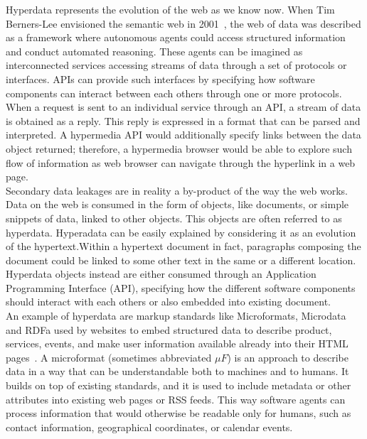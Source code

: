 Hyperdata represents the evolution of the web as we know now. When Tim Berners-­Lee envisioned the semantic web in 2001~\cite{SciAMMag}, the web of data was described as a framework where autonomous agents could access structured information and conduct automated reasoning. These agents can be imagined as interconnected services accessing streams of data through a set of protocols or interfaces. APIs can provide such interfaces by specifying how software components can interact between each others through one or more protocols. When a request is sent to an individual service through an API, a stream of data is obtained as a reply. This reply is expressed in a format that can be parsed and interpreted. A hypermedia API would additionally specify links between the data object returned; therefore, a hypermedia browser would be able to explore such flow of information as web browser can navigate through the hyperlink in a web page.\\

Secondary data leakages are in reality a by-product of the way the web works. Data on the web is consumed in the form of objects, like documents, or simple snippets of data, linked to other objects. This objects are often referred to as hyperdata. Hyperadata can be easily explained by considering it as an evolution of the hypertext.Within a hypertext document in fact, paragraphs composing the document could be linked to some other text in the same or a different location. Hyperdata objects instead are either consumed through an Application Programming Interface (API), specifying how the different software components should interact with each others or also embedded into existing document.\\

An example of hyperdata are markup standards like Microformats, Microdata and RDFa used by websites to embed structured data to describe product, services, events, and make user information available already into their HTML pages~\cite{bizer2013deployment}. A microformat (sometimes abbreviated $\mu F$) is an approach to describe data in a way that can be understandable both to machines and to humans. It builds on top of existing standards, and it is used to include metadata or other attributes into existing web pages or RSS feeds. This way software agents can process information that would otherwise be readable only for humans, such as contact information, geographical coordinates, or calendar events.\\

